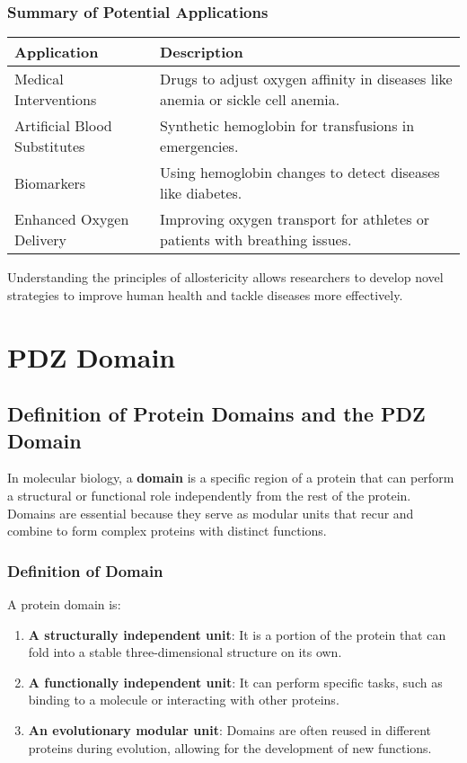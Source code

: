 \documentclass[English, Lau, oneside]{sapthesis}
\begin{document}
\subsection{Summary of Potential Applications}
\begin{center}
    \begin{tabular}{|l|p{10cm}|}
        \hline
        \textbf{Application} & \textbf{Description} \\ \hline
        Medical Interventions & Drugs to adjust oxygen affinity in diseases like anemia or sickle cell anemia. \\ \hline
        Artificial Blood Substitutes & Synthetic hemoglobin for transfusions in emergencies. \\ \hline
        Biomarkers & Using hemoglobin changes to detect diseases like diabetes. \\ \hline
        Enhanced Oxygen Delivery & Improving oxygen transport for athletes or patients with breathing issues. \\ \hline
    \end{tabular}
\end{center}

Understanding the principles of allostericity allows researchers to develop novel strategies to improve human health and tackle diseases more effectively.
\chapter{PDZ Domain}

\section*{Definition of Protein Domains and the PDZ Domain}

In molecular biology, a \textbf{domain} is a specific region of a protein that can perform a structural or functional role independently from the rest of the protein. Domains are essential because they serve as modular units that recur and combine to form complex proteins with distinct functions.

\subsection*{Definition of Domain}
A protein domain is:
\begin{enumerate}
    \item \textbf{A structurally independent unit}: It is a portion of the protein that can fold into a stable three-dimensional structure on its own.
    \item \textbf{A functionally independent unit}: It can perform specific tasks, such as binding to a molecule or interacting with other proteins.
    \item \textbf{An evolutionary modular unit}: Domains are often reused in different proteins during evolution, allowing for the development of new functions.
\end{enumerate}
\end{document}
